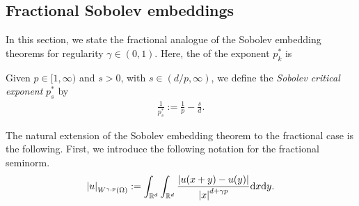 \documentclass[
    a4paper,
    DIV=14,
    abstract=true,
    numbers=noenddot
]{scrartcl}
\begin{document}
\subsection{Fractional Sobolev embeddings}
In this section, we state the fractional analogue of the Sobolev embedding theorems for regularity $\gamma \in (0,1)$.
Here, the  of the exponent $p_k^{*}$ is
\begin{definition}
    Given $p \in [1,\infty)$ and $s>0$, with $s\in (d/p, \infty)$, we define the \emph{Sobolev critical exponent} $p_s^*$ by
    \begin{align*}
        \frac{1}{p_s ^*}:=\frac{1}{p}-\frac{s }{d}.
    \end{align*}
\end{definition}
The natural extension of the Sobolev embedding theorem to the fractional case is the following. First, we introduce the following notation for the fractional seminorm.
\begin{align*}
    {\left| u \right|}_{W^{\gamma, p}(\Omega )}:=\int_{\mathbb{R}^d}\int_{\mathbb{R}^d}\frac{{\left| u(x+y)-u(y) \right|}}{{\left| x \right|}^{d+\gamma p}}\mathrm{d} x \mathrm{d} y.
\end{align*}
\end{document}
